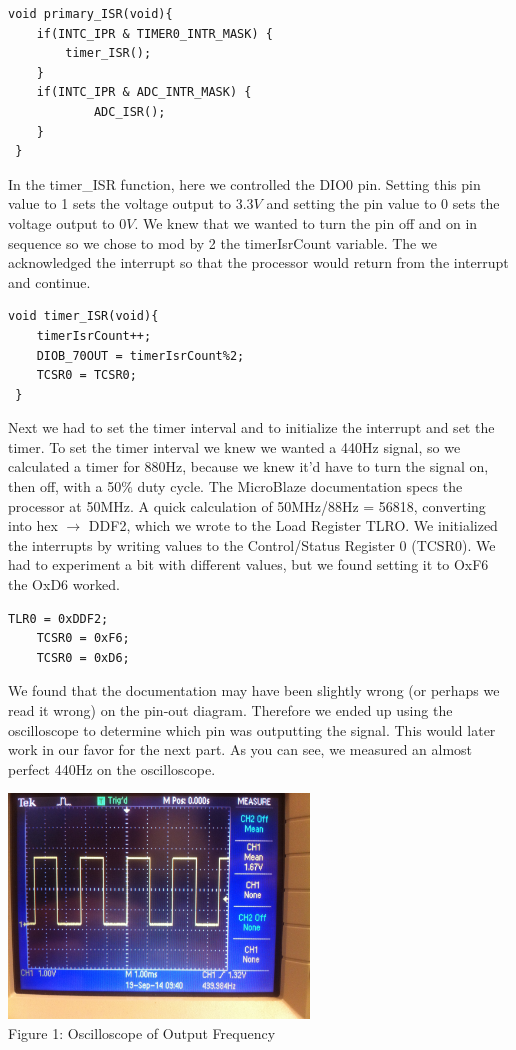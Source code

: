 \documentclass[twoside]{article}
\begin{document}
\begin{multicols}{2}
\begin{lstlisting}[frame=single]
void primary_ISR(void){
	if(INTC_IPR & TIMER0_INTR_MASK) {
		timer_ISR();
	}
	if(INTC_IPR & ADC_INTR_MASK) {
			ADC_ISR();
	}
 }
\end{lstlisting}

\noindent In the timer\_ISR function, here we controlled the DIO0 pin. Setting this pin value to 1 sets the voltage output to $3.3V$ and setting the pin value to 0 sets the voltage output to $0V$. We knew that we wanted to turn the pin off and on in sequence so we chose to mod by 2 the timerIsrCount variable. The we acknowledged the interrupt so that the processor would return from the interrupt and continue.\\
\newline

\begin{lstlisting}[frame=single]
void timer_ISR(void){
	timerIsrCount++;
	DIOB_70OUT = timerIsrCount%2;
	TCSR0 = TCSR0;
 }
\end{lstlisting}

\noindent Next we had to set the timer interval and to initialize the interrupt and set the timer. To set the timer interval we knew we wanted a 440Hz signal, so we calculated a timer for 880Hz, because we knew it'd have to turn the signal on, then off, with a 50\% duty cycle. The MicroBlaze documentation specs the processor at 50MHz. A quick calculation of 50MHz/88Hz = 56818, converting into hex $\rightarrow$ DDF2, which we wrote to the Load Register TLRO. We initialized the interrupts by writing values to the Control/Status Register 0 (TCSR0). We had to experiment a bit with different values, but we found setting it to OxF6 the OxD6 worked.\\

\begin{lstlisting}[frame=single]
	TLR0 = 0xDDF2;
	TCSR0 = 0xF6;
	TCSR0 = 0xD6;
\end{lstlisting}

\noindent We found that the documentation may have been slightly wrong (or perhaps we read it wrong) on the pin-out diagram. Therefore we ended up using the oscilloscope to determine which pin was outputting the signal. This would later work in our favor for the next part. As you can see, we measured an almost perfect 440Hz on the oscilloscope.\\

\begin{center}
\includegraphics*[width = 8cm]{Fig2.jpg}\\
Figure 1: Oscilloscope of Output Frequency
\end{center}


\end{multicols}
\end{document}
